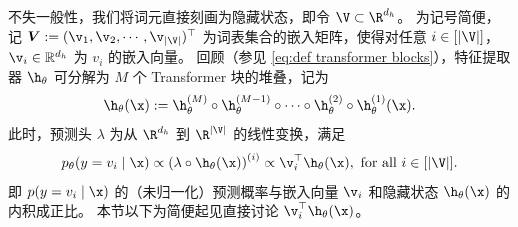 不失一般性，我们将词元直接刻画为隐藏状态，即令 $\V \subset \R^{d_h}$。
为记号简便，记 $\boldsymbol{V} := (\v_1, \v_2, \cdots, \v_{|\V|})^{\top}$ 为词表集合的嵌入矩阵，使得对任意 $i \in [|\V|]$，$\v_i \in \mathbb{R}^{d_h}$ 为 $v_i$ 的嵌入向量。
回顾（参见 \cref{eq:def transformer blocks}），特征提取器 $\h_{\theta}$ 可分解为 $M$ 个 Transformer 块的堆叠，记为 
\begin{equation*}
    \h_\theta(\x) := \h_{\theta}^{(M)} \circ \h_{\theta}^{(M-1)} \circ \cdots \circ \h_{\theta}^{(2)} \circ \h_{\theta}^{(1)}(\x).
\end{equation*}
此时，预测头 $\lambda$ 为从 $\R^{d_h}$ 到 $\R^{|\V|}$ 的线性变换，满足
\begin{equation}
    p_{\theta}(y = v_i \mid \x) \propto \left(\lambda \circ \h_{\theta} (\x)\right)^{(i)} \propto \v_i^{\top} \h_{\theta} (\x), \text{ for all } i \in [|\V|].
\end{equation}
即 $p(y = v_i \mid \x)$ 的（未归一化）预测概率与嵌入向量 $\v_i$ 和隐藏状态 $\h_{\theta} (\x)$ 的内积成正比。
本节以下为简便起见直接讨论 $\v_i^{\top} \h_{\theta} (\x)$。

